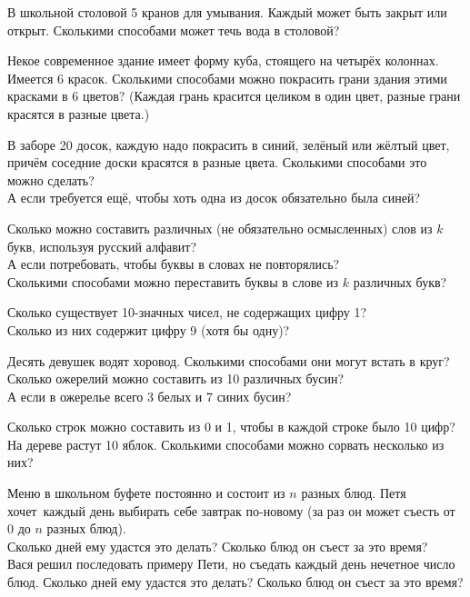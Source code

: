 \documentclass[a4paper,12pt]{article}
\begin{document}





В школьной столовой 5 кранов для умывания. Каждый может быть закрыт или
открыт. Сколькими способами может течь вода в столовой?

 Некое современное здание имеет форму куба, стоящего на
четырёх колоннах. Имеется 6 красок. Сколькими способами
можно покрасить грани здания этими красками в 6 цветов?
(Каждая грань красится целиком в один цвет,
разные грани красятся в разные цвета.)

 
В заборе 20 досок, каждую надо покрасить в синий, зелёный или жёлтый
цвет, причём соседние доски красятся в разные цвета.
Сколькими способами это можно сделать?
\\ А если требуется ещё, чтобы хоть одна из досок
обязательно была синей?

Сколько можно составить различных
(не обязательно осмысленных) слов из $k$ букв,
используя русский алфавит?
\\
А если потребовать, чтобы буквы в словах не повторялись?
\\
Сколькими способами можно переставить буквы в слове из $k$ различных букв?


Сколько существует 10-значных чисел, не содержащих цифру 1?
\\
Сколько из них содержит  цифру 9 (хотя бы одну)?

Десять девушек водят хоровод. Сколькими способами они могут встать
в круг?
\\
Сколько ожерелий можно составить из 10 различных бусин?
\\ А если в ожерелье всего 3 белых и 7 синих бусин?

Сколько строк можно составить из 0 и 1, чтобы в каждой строке было 10 цифр?\\
На дереве растут 10 яблок. Сколькими способами можно сорвать
несколько из них?

Меню в школьном буфете постоянно и состоит из $n$ разных блюд.
Петя хочет~каж\-дый день выбирать себе завтрак по-новому
(за раз он может съесть от 0 до $n$ разных блюд).\\
  Сколько дней ему удастся это делать?
  Сколько блюд он съест за это время?\\
 Вася решил последовать примеру Пети,
но съедать каждый день нечетное число блюд.
Сколько дней ему удастся это делать?
  Сколько блюд он съест за это время?
\end{document}
